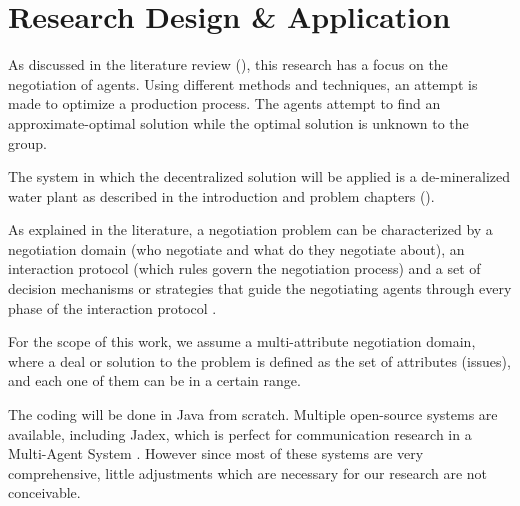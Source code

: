 \chapter{Research Design \& Application}
\label{ch:design}
As discussed in the literature review (), this research has a focus on the negotiation of agents. Using different methods and techniques, an attempt is made to optimize a production process. The agents attempt to find an approximate-optimal solution while the optimal solution is unknown to the group. %

The system in which the  decentralized solution will be applied is a de-mineralized water plant as described in the introduction and problem chapters ().

As explained in the literature, a negotiation problem can be characterized by a negotiation domain (who negotiate and what do they negotiate about), an interaction protocol (which rules govern the negotiation process) and a set of decision mechanisms or strategies that guide the negotiating agents through every phase of the interaction protocol \citep{fatima2014principles}.

For the scope of this work, we assume a multi-attribute negotiation domain, where a deal or solution to the problem is defined as the set of attributes (issues), and each one of them can be in a certain range.

The coding will be done in Java from scratch. Multiple open-source systems are available, including Jadex, which is perfect for communication research in a Multi-Agent System \citep{kravari2015survey}. However since most of these systems are very comprehensive, little adjustments which are necessary for our research are not conceivable.

